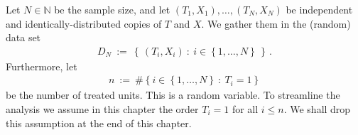 Let  $N\in\mathbb{N}$ be the sample size, and let $(T_1,X_1),\ldots,(T_N,X_N)$ be independent and identically-distributed copies of $T$ and $X$. 
We gather them in the (random) data set 
\begin{gather*}
D_N
\ 
:=
\ 
\left\{\, (T_i,X_i)\ \colon\  i\in \left\{ 1,\ldots,N \right\}\, \right\}
\,.
\end{gather*}
Furthermore, let 
\begin{gather*}
  n
  \ 
  :=
  \ 
  \# 
  \left\{ 
    i\in \left\{ 1,\ldots,N \right\}
    \ 
    \colon
    \ 
    T_i=1
  \right\}
\end{gather*}
be the number of treated units. This is a random variable. 
To streamline the analysis we assume in this chapter the order $T_i=1$ for all $i\le n$.
We shall drop this assumption at the end of this chapter.
